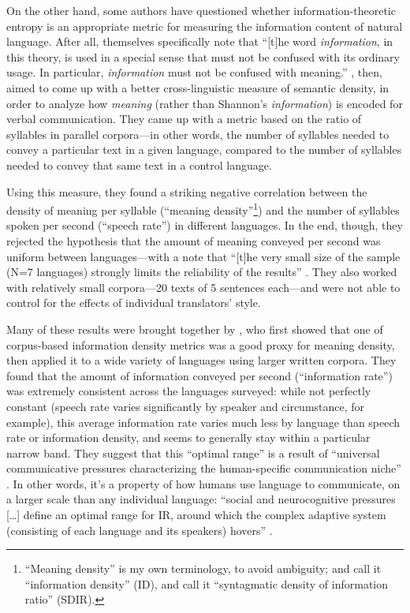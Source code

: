 \documentclass[12pt,twoside]{article}
\begin{document}
On the other hand, some authors have questioned whether information-theoretic entropy is an appropriate metric for measuring the information content of natural language. After all, \citet[8]{shannon} themselves specifically note that ``[t]he word \emph{information}, in this theory, is used in a special sense that must not be confused with its ordinary usage. In particular, \emph{information} must not be confused with meaning.'' \citet{pellegrino}, then, aimed to come up with a better cross-linguistic measure of semantic density, in order to analyze how \emph{meaning} (rather than Shannon's \emph{information}) is encoded for verbal communication. They came up with a metric based on the ratio of syllables in parallel corpora---in other words, the number of syllables needed to convey a particular text in a given language, compared to the number of syllables needed to convey that same text in a control language.

Using this measure, they found a striking negative correlation between the density of meaning per syllable (``meaning density''\footnote{``Meaning density'' is my own terminology, to avoid ambiguity; \citet{pellegrino} and \citet{oh} call it ``information density'' (ID), and \citet{coupé} call it ``syntagmatic density of information ratio'' (SDIR).}) and the number of syllables spoken per second (``speech rate'') in different languages. In the end, though, they rejected the hypothesis that the amount of meaning conveyed per second was uniform between languages---with a note that ``[t]he very small size of the sample (N=7 languages) strongly limits the reliability of the results'' \citep[550]{pellegrino}. They also worked with relatively small corpora---20 texts of 5 sentences each---and were not able to control for the effects of individual translators' style.

Many of these results were brought together by \citet{coupé}, who first showed that one of  corpus-based information density metrics was a good proxy for  meaning density, then applied it to a wide variety of languages using larger written corpora. They found that the amount of information conveyed per second (``information rate'') was extremely consistent across the languages surveyed: while not perfectly constant (speech rate varies significantly by speaker and circumstance, for example), this average information rate varies much less by language than speech rate or information density, and seems to generally stay within a particular narrow band. They suggest that this ``optimal range'' is a result of ``universal communicative pressures characterizing the human-specific communication niche'' \citep[6]{coupé}. In other words, it's a property of how humans use language to communicate, on a larger scale than any individual language: ``social and neurocognitive pressures [\ldots] define an optimal range for IR, around which the complex adaptive system (consisting of each language and its speakers) hovers'' \citep[6]{coupé}.
\end{document}
